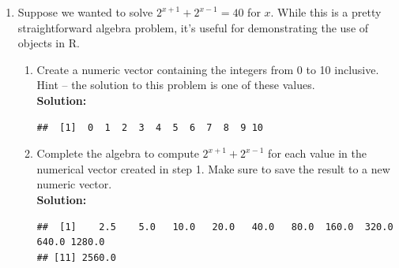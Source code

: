 \documentclass{article}\usepackage[]{graphicx}\usepackage[]{xcolor}
\makeatletter
\newenvironment{kframe}{%
 \def\at@end@of@kframe{}%
 \ifinner\ifhmode%
  \def\at@end@of@kframe{\end{minipage}}%
  \begin{minipage}{\columnwidth}%
 \fi\fi%
 \def\FrameCommand##1{\hskip\@totalleftmargin \hskip-\fboxsep
 \colorbox{shadecolor}{##1}\hskip-\fboxsep
     \hskip-\linewidth \hskip-\@totalleftmargin \hskip\columnwidth}%
 \MakeFramed {\advance\hsize-\width
   \@totalleftmargin\z@ \linewidth\hsize
   \@setminipage}}%
 {\par\unskip\endMakeFramed%
 \at@end@of@kframe}
\newenvironment{knitrout}{}{} %
\makeatother
\begin{document}
\begin{enumerate}
\item Suppose we wanted to solve $2^{x+1} +2^{x-1} = 40$ for $x$. While this is a pretty straightforward algebra problem, it's useful for demonstrating the use of objects in R. 
  \begin{enumerate}
  \item Create a numeric vector containing the integers from 0 to 10 inclusive. Hint -- the solution to this problem is one of these values.\\
\textbf{Solution:}
\begin{knitrout}\scriptsize
{}\color{fgcolor}\begin{kframe}
\begin{verbatim}
##  [1]  0  1  2  3  4  5  6  7  8  9 10
\end{verbatim}
\end{kframe}
\end{knitrout}
  \item Complete the algebra to compute $2^{x+1} +2^{x-1}$ for each value in the numerical vector created in step 1. Make sure to save the result to a new numeric vector.\\
\textbf{Solution:}
\begin{knitrout}\scriptsize
{}\color{fgcolor}\begin{kframe}
\begin{verbatim}
##  [1]    2.5    5.0   10.0   20.0   40.0   80.0  160.0  320.0  640.0 1280.0
## [11] 2560.0
\end{verbatim}
\end{kframe}
\end{knitrout}

\end{enumerate}
\end{enumerate}
\end{document}
